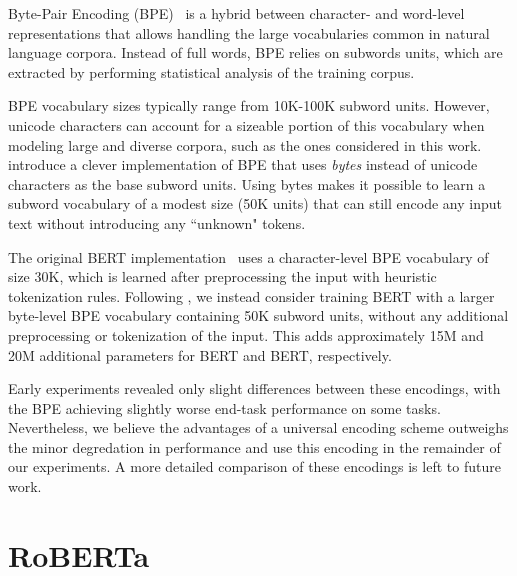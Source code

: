 \documentclass[11pt]{article}
\newcommand{\ourmodel}{RoBERTa}
\newcommand{\bertbase}{BERT}
\newcommand{\bertlarge}{BERT}
\begin{document}
Byte-Pair Encoding (BPE)~\cite{sennrich2016neural} is a hybrid between character- and word-level representations that allows handling the large vocabularies common in natural language corpora.
Instead of full words, BPE relies on subwords units, which are extracted by performing statistical analysis of the training corpus.

BPE vocabulary sizes typically range from 10K-100K subword units. However, unicode characters can account for a sizeable portion of this vocabulary when modeling large and diverse corpora, such as the ones considered in this work.
 introduce a clever implementation of BPE that uses \emph{bytes} instead of unicode characters as the base subword units.
Using bytes makes it possible to learn a subword vocabulary of a modest size (50K units) that can still encode any input text without introducing any ``unknown" tokens.

The original BERT implementation~\cite{devlin2018bert} uses a character-level BPE vocabulary of size 30K, which is learned after preprocessing the input with heuristic tokenization rules.
Following , we instead consider training BERT with a larger byte-level BPE vocabulary containing 50K subword units, without any additional preprocessing or tokenization of the input.
This adds approximately 15M and 20M additional parameters for \bertbase{} and \bertlarge{}, respectively.

Early experiments revealed only slight differences between these encodings, with the  BPE achieving slightly worse end-task performance on some tasks.
Nevertheless, we believe the advantages of a universal encoding scheme outweighs the minor degredation in performance and use this encoding in the remainder of our experiments.
A more detailed comparison of these encodings is left to future work. \section{\ourmodel{}} \label{sec:roberta}
\end{document}
